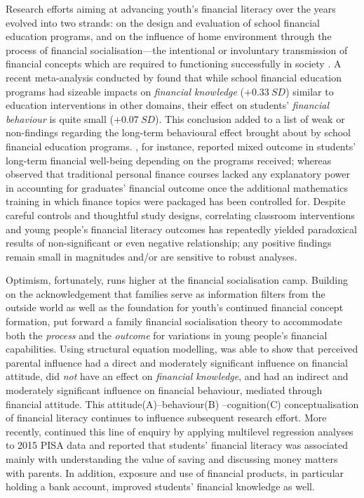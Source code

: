 \documentclass[a4paper,11pt,UKenglish,twoside,openright]{report}\usepackage[]{graphicx}\usepackage[]{color}
\begin{document}
Research efforts aiming at advancing youth's financial literacy over the years evolved into two strands: on the design and evaluation of school financial education programs, and on the influence of home environment through the process of financial socialisation---the intentional or involuntary transmission of financial concepts which are required to functioning successfully in society \parencite{bowen:2002}. A recent meta-analysis conducted by \textcite{kaiser:2020} found that while school financial education programs had sizeable impacts on \emph{financial knowledge} ($+0.33\ SD$) similar to education interventions in other domains, their effect on students' \emph{financial behaviour} is quite small ($+0.07\ SD$). This conclusion added to a list of weak or non-findings regarding the long-term behavioural effect brought about by school financial education programs. \textcite{brown:2016}, for instance, reported mixed outcome in students' long-term financial well-being depending on the programs received; whereas \textcite{cole:2016} observed that traditional personal finance courses lacked any explanatory power in accounting for graduates' financial outcome once the additional mathematics training in which finance topics were packaged has been controlled for. Despite careful controls and thoughtful study designs, correlating classroom interventions and young people's financial literacy outcomes has repeatedly yielded paradoxical results of non-significant or even negative relationship; any positive findings remain small in magnitudes and/or are sensitive to robust analyses.

Optimism, fortunately, runs higher at the financial socialisation camp. Building on the acknowledgement that families serve as information filters from the outside world \parencite{danes:2007} as well as the foundation for youth's continued financial concept formation, \textcite{gudmunson:2011} put forward a family financial socialisation theory to accommodate both the \emph{process} and the \emph{outcome} for variations in young people's financial capabilities. Using structural equation modelling, \textcite{jorgensen:2010} was able to show that perceived parental influence had a direct and moderately significant influence on financial attitude, did \emph{not} have an effect on \emph{financial knowledge}, and had an indirect and moderately significant influence on financial behaviour, mediated through financial attitude. This attitude(A)--behaviour(B)
--cognition(C) conceptualisation of financial literacy \parencite{potrich:2015} continues to influence subsequent research effort. More recently, \textcite{morenoherrero:2018a} continued this line of enquiry by applying multilevel regression analyses to 2015 PISA data and reported that students' financial literacy was associated mainly with understanding the value of saving and discussing money matters with parents. In addition, exposure and use of financial products, in particular holding a bank account, improved students' financial knowledge as well.
\end{document}
